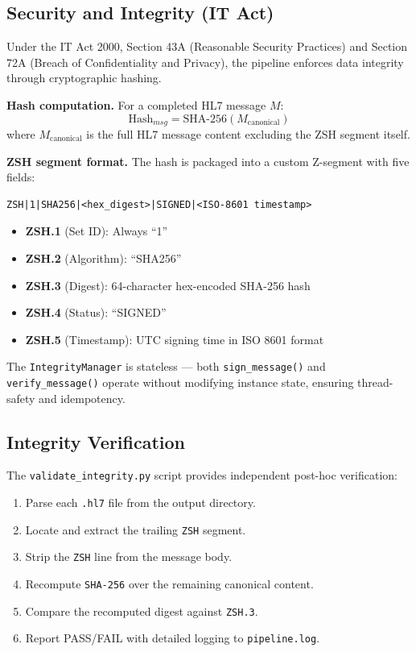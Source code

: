 \documentclass[12pt,a4paper]{report}
\begin{document}
\subsection{Security and Integrity (IT Act)}

Under the IT Act 2000, Section 43A (Reasonable Security Practices) and Section 72A
(Breach of Confidentiality and Privacy), the pipeline enforces data integrity through
cryptographic hashing.

\textbf{Hash computation.} For a completed HL7 message $M$:
\begin{equation}
    \text{Hash}_{msg} = \text{SHA-256}(M_{\text{canonical}})
\end{equation}
where $M_{\text{canonical}}$ is the full HL7 message content excluding the ZSH segment
itself.

\textbf{ZSH segment format.} The hash is packaged into a custom Z-segment with five
fields:
\begin{verbatim}
ZSH|1|SHA256|<hex_digest>|SIGNED|<ISO-8601 timestamp>
\end{verbatim}

\begin{itemize}
    \item \textbf{ZSH.1} (Set ID): Always ``1''
    \item \textbf{ZSH.2} (Algorithm): ``SHA256''
    \item \textbf{ZSH.3} (Digest): 64-character hex-encoded SHA-256 hash
    \item \textbf{ZSH.4} (Status): ``SIGNED''
    \item \textbf{ZSH.5} (Timestamp): UTC signing time in ISO 8601 format
\end{itemize}

The \texttt{IntegrityManager} is stateless --- both \texttt{sign\_message()} and
\texttt{verify\_message()} operate without modifying instance state, ensuring
thread-safety and idempotency.

\subsection{Integrity Verification}

The \texttt{validate\_integrity.py} script provides independent post-hoc verification:
\begin{enumerate}
    \item Parse each \texttt{.hl7} file from the output directory.
    \item Locate and extract the trailing \texttt{ZSH} segment.
    \item Strip the \texttt{ZSH} line from the message body.
    \item Recompute \texttt{SHA-256} over the remaining canonical content.
    \item Compare the recomputed digest against \texttt{ZSH.3}.
    \item Report PASS/FAIL with detailed logging to \texttt{pipeline.log}.
\end{enumerate}
\end{document}
